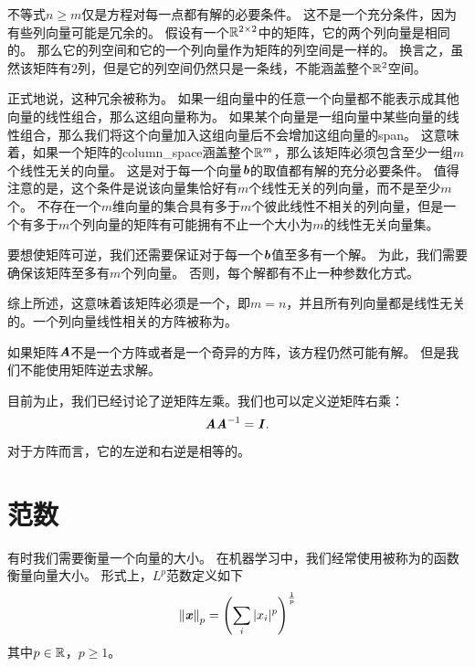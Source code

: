 

不等式$n\geq m$仅是方程对每一点都有解的必要条件。
这不是一个充分条件，因为有些列向量可能是冗余的。
假设有一个$\mathbb{R}^{2\times 2}$中的矩阵，它的两个列向量是相同的。
那么它的列空间和它的一个列向量作为矩阵的列空间是一样的。
换言之，虽然该矩阵有$2$列，但是它的列空间仍然只是一条线，不能涵盖整个$\mathbb{R}^2$空间。


正式地说，这种冗余被称为。
如果一组向量中的任意一个向量都不能表示成其他向量的线性组合，那么这组向量称为。
如果某个向量是一组向量中某些向量的线性组合，那么我们将这个向量加入这组向量后不会增加这组向量的\gls{span}。
这意味着，如果一个矩阵的\gls{column_space}涵盖整个$\mathbb{R}^m$，那么该矩阵必须包含至少一组$m$个线性无关的向量。
这是对于每一个向量$\boldsymbol{\mathit{b}}$的取值都有解的充分必要条件。
值得注意的是，这个条件是说该向量集恰好有$m$个线性无关的列向量，而不是至少$m$个。
不存在一个$m$维向量的集合具有多于$m$个彼此线性不相关的列向量，但是一个有多于$m$个列向量的矩阵有可能拥有不止一个大小为$m$的线性无关向量集。


要想使矩阵可逆，我们还需要保证对于每一个$\boldsymbol{\mathit{b}}$值至多有一个解。
为此，我们需要确保该矩阵至多有$m$个列向量。
否则，每个解都有不止一种参数化方式。


综上所述，这意味着该矩阵必须是一个，即$m=n$，并且所有列向量都是线性无关的。一个列向量线性相关的方阵被称为。


如果矩阵$\boldsymbol{\mathit{A}}$不是一个方阵或者是一个奇异的方阵，该方程仍然可能有解。
但是我们不能使用矩阵逆去求解。


目前为止，我们已经讨论了逆矩阵左乘。我们也可以定义逆矩阵右乘：
\begin{equation}
\boldsymbol{\mathit{A}}\boldsymbol{\mathit{A}}^{-1}=\boldsymbol{\mathit{I}}.
\end{equation}
对于方阵而言，它的左逆和右逆是相等的。




\section{范数}
\label{sec:norms}

有时我们需要衡量一个向量的大小。
在机器学习中，我们经常使用被称为的函数衡量向量大小。
形式上，$L^p$范数定义如下
\begin{equation}
    \left\lVert\boldsymbol{\mathit{x}}\right\rVert_p = \left( \sum_i |x_i|^p \right)^{\frac{1}{p}}
\label{eq:2.30}
\end{equation}
其中$p\in \mathbb{R}$，$p\geq 1$。



